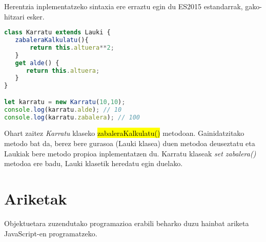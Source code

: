 Herentzia inplementatzeko sintaxia ere erraztu egin du ES2015 estandarrak,  gako-hitzari esker.

\begin{lstlisting}[language=JavaScript, numbers=none]
class Karratu extends Lauki {
   zabaleraKalkulatu(){
       return this.altuera**2;
   }
   get alde() {
      return this.altuera;
   }
}

let karratu = new Karratu(10,10);
console.log(karratu.alde); // 10
console.log(karratu.zabalera); // 100

\end{lstlisting}

Ohart zaitez \textit{Karratu} klaseko \hl{zabaleraKalkulatu()} metodoan. Gainidatzitako metodo bat da, berez bere gurasoa (Lauki klasea) duen metodoa deuseztatu eta Laukiak bere metodo propioa inplementatzen du. Karratu klaseak \textit{set zabalera()} metodoa ere badu, Lauki klasetik heredatu egin duelako.

\section{Ariketak}

 Objektuetara zuzendutako programazioa erabili beharko duzu hainbat ariketa \newline JavaScript-en programatzeko.

